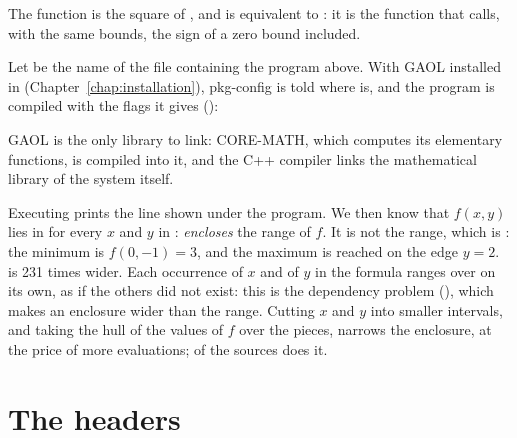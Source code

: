 The function  is the square of , and is equivalent
to : it is the function that 
calls, with the same bounds, the sign of a zero bound
included.\newinvfive

\medskip
Let  be the name of the file containing the program above. With
GAOL installed in  (Chapter~\ref{chap:installation}), pkg-config is
told where  is, and the program is compiled with the flags it
gives ():
%


\noindent
GAOL is the only library to link: CORE-MATH, which computes its elementary
functions, is compiled into it, and the C++ compiler links the mathematical
library of the system itself.

Executing  prints the line shown under the program. We then know that
$f(x,y)$ lies in  for every $x$ and $y$ in
:  \emph{encloses} the range of $f$. It is not the range,
which is : the minimum is $f(0,-1)=3$, and the
maximum is reached on the edge $y=2$.  is 231 times wider. Each
occurrence of $x$ and of $y$ in the formula ranges over  on its
own, as if the others did not exist: this is the dependency problem
(), which makes an enclosure wider than the range.
%
Cutting $x$ and $y$ into smaller intervals, and taking the hull of the values
of $f$ over the pieces, narrows the enclosure, at the price of more
evaluations;  of the sources does
it.

\section{The headers}\label{sec:headers}
%

